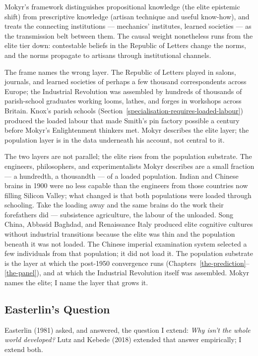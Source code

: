 \documentclass[12pt,letterpaper]{article}
\begin{document}
Mokyr's framework distinguishes propositional knowledge (the elite epistemic shift) from prescriptive knowledge (artisan technique and useful know-how), and treats the connecting institutions --- mechanics' institutes, learned societies --- as the transmission belt between them. The causal weight nonetheless runs from the elite tier down: contestable beliefs in the Republic of Letters change the norms, and the norms propagate to artisans through institutional channels.

The frame names the wrong layer. The Republic of Letters played in salons, journals, and learned societies of perhaps a few thousand correspondents across Europe; the Industrial Revolution was assembled by hundreds of thousands of parish-school graduates working looms, lathes, and forges in workshops across Britain. Knox's parish schools (Section~\ref{specialisation-requires-loaded-labour}) produced the loaded labour that made Smith's pin factory possible a century before Mokyr's Enlightenment thinkers met. Mokyr describes the elite layer; the population layer is in the data underneath his account, not central to it.

The two layers are not parallel; the elite rises from the population substrate. The engineers, philosophers, and experimentalists Mokyr describes are a small fraction --- a hundredth, a thousandth --- of a loaded population. Indian and Chinese brains in 1900 were no less capable than the engineers from those countries now filling Silicon Valley; what changed is that both populations were loaded through schooling. Take the loading away and the same brains do the work their forefathers did --- subsistence agriculture, the labour of the unloaded. Song China, Abbasid Baghdad, and Renaissance Italy produced elite cognitive cultures without industrial transitions because the elite was thin and the population beneath it was not loaded. The Chinese imperial examination system selected a few individuals from that population; it did not load it. The population substrate is the layer at which the post-1950 convergence runs (Chapters~\ref{the-prediction}--\ref{the-panel}), and at which the Industrial Revolution itself was assembled. Mokyr names the elite; I name the layer that grows it.

\subsection{Easterlin's Question}\label{easterlins-question}

Easterlin (1981) asked, and answered, the question I extend: \emph{Why isn't the whole world developed?} Lutz and Kebede (2018) extended that answer empirically; I extend both.
\end{document}

